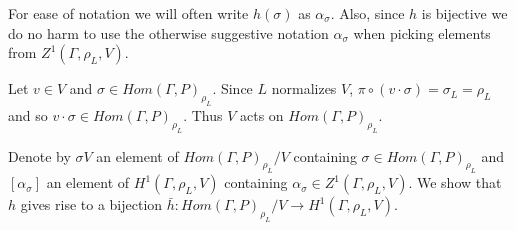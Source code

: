 For ease of notation we will often write $h(\sigma)$ as $\alpha_\sigma$. Also, since $h$ is bijective we do no harm to use the otherwise suggestive notation $\alpha_\sigma$ when picking elements from $Z^1(\Gamma, \rho_L, V)$.

Let $v \in V$ and $\sigma \in Hom(\Gamma, P)_{\rho_L}$. Since $L$ normalizes $V$, $\pi \circ (v \cdot \sigma) = \sigma_L = \rho_L$ and so $v \cdot \sigma \in Hom(\Gamma, P)_{\rho_L}$. Thus $V$ acts on $Hom(\Gamma, P)_{\rho_L}$.

Denote by $\sigma V$ an element of $Hom(\Gamma, P)_{\rho_L}/V$ containing $\sigma \in Hom(\Gamma, P)_{\rho_L}$ and $[\alpha_\sigma]$ an element of $H^1(\Gamma, \rho_L, V)$ containing $\alpha_\sigma \in Z^1(\Gamma, \rho_L, V)$. We show that $h$ gives rise to a bijection $\bar{h}: Hom(\Gamma,P)_{\rho_L}/V\rightarrow H^{1}(\Gamma, \rho_L, V)$.


